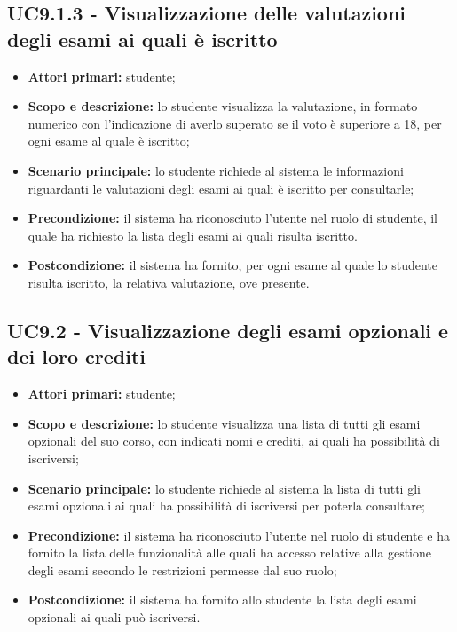 \documentclass[AnalisiDeiRequisiti.tex]{subfiles}
\begin{document}
\subsection{UC9.1.3 - Visualizzazione delle valutazioni degli esami ai quali è iscritto}
\begin{itemize}
	\item \textbf{Attori primari:} studente;
	\item \textbf{Scopo e descrizione:} lo studente visualizza la valutazione, in formato numerico con l'indicazione di averlo superato se il voto è superiore a 18, per ogni esame al quale è iscritto;
	\item \textbf{Scenario principale:} lo studente richiede al sistema le informazioni riguardanti le valutazioni degli esami ai quali è iscritto per consultarle;
	\item \textbf{Precondizione:} il sistema ha riconosciuto l'utente nel ruolo di studente, il quale ha richiesto la lista degli esami ai quali risulta iscritto. 
	\item \textbf{Postcondizione:} il sistema ha fornito, per ogni esame al quale lo studente risulta iscritto, la relativa valutazione, ove presente.
\end{itemize}

\subsection{UC9.2 - Visualizzazione degli esami opzionali e dei loro crediti}
\begin{itemize}
	\item \textbf{Attori primari:} studente;
	\item \textbf{Scopo e descrizione:} lo studente visualizza una lista di tutti gli esami opzionali del suo corso, con indicati nomi e crediti, ai quali ha possibilità di iscriversi;
	\item \textbf{Scenario principale:} lo studente richiede al sistema la lista di tutti gli esami opzionali ai quali ha possibilità di iscriversi per poterla consultare;
	\item \textbf{Precondizione:} il sistema ha riconosciuto l'utente nel ruolo di studente e ha fornito la lista delle funzionalità alle quali ha accesso relative alla gestione degli esami secondo le restrizioni permesse dal suo ruolo; 
\item \textbf{Postcondizione:} il sistema ha fornito allo studente la lista degli esami opzionali ai quali può iscriversi.
\end{itemize}
\end{document}
